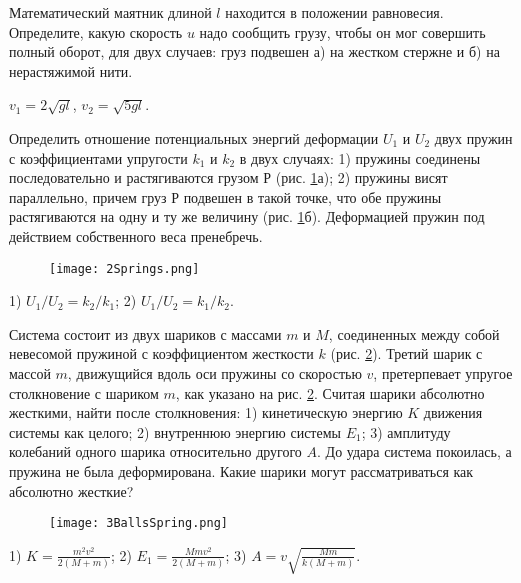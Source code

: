 \begin{ex} %
Математический маятник длиной $l$ находится в положении равновесия. Определите, какую скорость $u$ надо сообщить грузу, чтобы он мог совершить полный оборот, для двух случаев: груз подвешен а) на жестком стержне и б) на нерастяжимой нити.
\begin{ans}
$v_1 = 2\sqrt{gl}$, $v_2 = \sqrt{5gl}$.
\end{ans}
\end{ex}

\begin{ex} %
Определить отношение потенциальных энергий деформации $U_1$ и $U_2$ двух пружин с коэффициентами упругости $k_1$ и $k_2$ в двух случаях: 1) пружины соединены последовательно и растягиваются грузом $Р$ (рис. \ref{2Springs}а); 2) пружины висят параллельно, причем груз $Р$ подвешен в такой точке, что обе пружины растягиваются на одну и ту же величину (рис. \ref{2Springs}б). Деформацией пружин под действием собственного веса пренебречь.

\begin{figure}[h]
\centering
\texttt{[image: 2Springs.png]}
\caption{}
\label{2Springs}
\end{figure}

\begin{ans}
1) $U_1/U_2 = k_2/k_1$; 2) $U_1/U_2 = k_1/k_2$.
\end{ans}
\end{ex}

\begin{ex} %
Система состоит из двух шариков с массами $m$ и $M$, соединенных между собой невесомой пружиной с коэффициентом жесткости $k$ (рис. \ref{3BallsSpring}). Третий шарик с массой $m$, движущийся вдоль оси пружины со скоростью $v$, претерпевает упругое столкновение с шариком $m$, как указано на рис. \ref{3BallsSpring}. Считая шарики абсолютно жесткими, найти после столкновения: 1) кинетическую энергию $K$ движения системы как целого; 2) внутреннюю энергию системы $E_1$; 3) амплитуду колебаний одного шарика относительно другого $A$. До удара система покоилась, а пружина не была деформирована. Какие шарики могут рассматриваться как абсолютно жесткие?	

\begin{figure}[h]
\centering
\texttt{[image: 3BallsSpring.png]}
\caption{}
\label{3BallsSpring}
\end{figure}

\begin{ans}
1) $K=\frac{m^2v^2}{2(M+m)}$; 2) $E_1 = \frac{Mmv^2}{2(M+m)}$; 3) $A = v\sqrt{\frac{Mm}{k(M+m)}}$.
\end{ans}
\end{ex}

